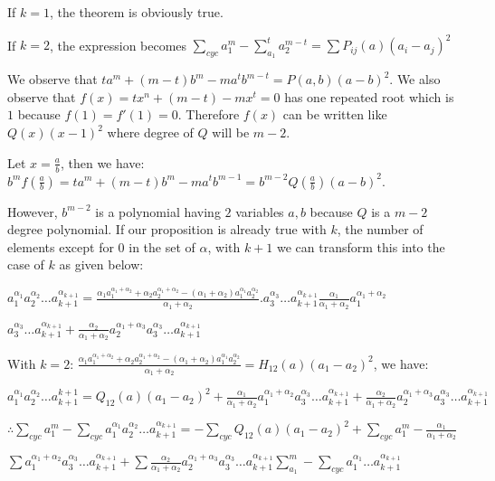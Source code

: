   If $k = 1$, the theorem is obviously true.

  If $k = 2$, the expression becomes $\sum_{cyc}a_1^m - \sum_{a_1}^ta_2^{m - t} = \sum P_{ij}(a)(a_i - a_j)^2$

  We observe that $ta^m + (m - t)b^m - ma^tb^{m - t} = P(a, b)(a - b)^2$. We also observe that $f(x) = tx^n + (m - t) - mx^t = 0$
  has one repeated root which is $1$ because $f(1) = f'(1) = 0$. Therefore $f(x)$ can be written like $Q(x)(x - 1)^2$ where degree
  of $Q$ will be $m - 2$.

  Let $x = \frac{a}{b}$, then we have: $b^mf\left(\frac{a}{b}\right) = ta^m + (m - t)b^m - ma^tb^{m - 1} = b^{m -
    2}Q\left(\frac{a}{b}\right)(a - b)^2$.

  However, $b^{m - 2}$ is a polynomial having $2$ variables $a, b$ because $Q$ is a $m - 2$ degree polynomial. If our proposition
  is already true with $k$, the number of elements except for $0$ in the set of $\alpha$, with $k + 1$ we can transform this into
  the case of $k$ as given below:

  $a_1^{\alpha_1}a_2^{\alpha_2}\ldots a_{k+1}^{\alpha_{k +1}} = \frac{\alpha_1a_1^{\alpha_1 + \alpha_2} + \alpha_2a_2^{\alpha_1 +
      \alpha_2} - (\alpha_1 + \alpha_2)a_1^{\alpha_1}a_2^{\alpha_2}}{\alpha_1 + \alpha_2}.a_3^{\alpha_3}\ldots a_{k+1}^{\alpha_{k
    +1}}\frac{\alpha_1}{\alpha_1 + \alpha_2}a_1^{\alpha_1+\alpha_2}$

  $a_3^{\alpha_3}\ldots a_{k + 1}^{\alpha_{k + 1}} + \frac{\alpha_2}{\alpha_1 + \alpha_2}a_2^{\alpha_1 + \alpha_3}a_3^{\alpha_3}\ldots a_{k
    + 1}^{\alpha_{k +1}}$

  With $k = 2$: $\frac{\alpha_1a_1^{\alpha_1 + \alpha_2} + \alpha_2a_2^{\alpha_1 + \alpha_2} - (\alpha_1 +
    \alpha_2)a_1^{\alpha_1}a_2^{\alpha_2}}{\alpha_1 + \alpha_2} = H_{12}(a)(a_1 - a_2)^2$, we have:

  $a_1^{\alpha_1}a_2^{\alpha_2}\ldots a_{k+1}^{k + 1} = Q_{12}(a)(a_1 - a_2)^2 + \frac{\alpha_1}{\alpha_1 +
    \alpha_2}a_1^{\alpha_1+\alpha_2}a_3^{\alpha_3}\ldots a_{k + 1}^{\alpha_{k + 1}} + \frac{\alpha_2}{\alpha_1 + \alpha_2}a_2^{\alpha_1 +
    \alpha_3}a_3^{\alpha_3}\ldots a_{k + 1}^{\alpha_{k +1}}$

  $\therefore \sum_{cyc}a_1^m - \sum_{cyc}a_1^{\alpha_1}a_2^{\alpha_2}\ldots a_{k + 1}^{\alpha_{k + 1}} = -\sum_{cyc}Q_{12}(a)(a_1
  - a_2)^2 + \sum_{cyc}a_1^m - \frac{\alpha_1}{\alpha_1 +
    \alpha_2}$

  $\sum a_1^{\alpha_1+\alpha_2} a_3^{\alpha_3}\ldots a_{k + 1}^{\alpha_{k + 1}} + \sum\frac{\alpha_2}{\alpha_1 +
    \alpha_2}a_2^{\alpha_1 +\alpha_3}a_3^{\alpha_3}\ldots a_{k + 1}^{\alpha_{k +1}} \sum_{a_1}^m - \sum_{cyc}a_1^{\alpha_1}\ldots
  a_{k +1}^{\alpha_{k +1}}$

